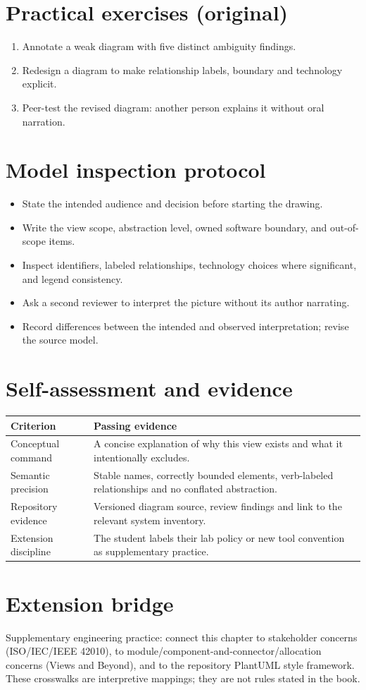 \documentclass[10pt,letterpaper]{article}
\begin{document}
\section{Practical exercises (original)}
\begin{enumerate}
\item Annotate a weak diagram with five distinct ambiguity findings.
\item Redesign a diagram to make relationship labels, boundary and technology explicit.
\item Peer-test the revised diagram: another person explains it without oral narration.
\end{enumerate}

\section{Model inspection protocol}
\begin{itemize}
\item State the intended audience and decision before starting the drawing.
\item Write the view scope, abstraction level, owned software boundary, and out-of-scope items.
\item Inspect identifiers, labeled relationships, technology choices where significant, and legend consistency.
\item Ask a second reviewer to interpret the picture without its author narrating.
\item Record differences between the intended and observed interpretation; revise the source model.
\end{itemize}

\section{Self-assessment and evidence}
\begin{tabularx}{\linewidth}{@{}YY@{}}\toprule
\textbf{Criterion} & \textbf{Passing evidence} \\ \midrule
Conceptual command & A concise explanation of why this view exists and what it intentionally excludes. \\
Semantic precision & Stable names, correctly bounded elements, verb-labeled relationships and no conflated abstraction. \\
Repository evidence & Versioned diagram source, review findings and link to the relevant system inventory. \\
Extension discipline & The student labels their lab policy or new tool convention as supplementary practice. \\
\bottomrule\end{tabularx}


\section{Extension bridge}
Supplementary engineering practice: connect this chapter to stakeholder concerns (ISO/IEC/IEEE 42010), to module/component-and-connector/allocation concerns (Views and Beyond), and to the repository PlantUML style framework. These crosswalks are interpretive mappings; they are not rules stated in the book.
\end{document}
